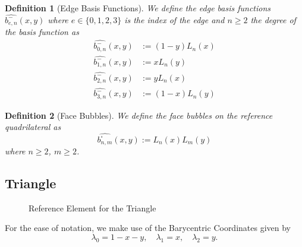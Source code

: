 \documentclass[10pt,a4paper]{article}
\newtheorem{defn}{Definition}
\begin{document}
    \begin{defn}[Edge Basis Functions]
        We define the edge basis functions $\widehat{b_{e,n}^{-}}(x,y)$ where $e \in \{0,1,2,3\}$ is the index of the edge and $n \geq 2$ the degree of the basis function as
        \begin{align*}
            \widehat{b_{0,n}^{-}}(x,y) &:= (1-y)L_n(x) \\
            \widehat{b_{1,n}^{-}}(x,y) &:= xL_n(y) \\
            \widehat{b_{2,n}^{-}}(x,y) &:= yL_n(x) \\
            \widehat{b_{3,n}^{-}}(x,y) &:= (1-x)L_n(y)
        \end{align*}
    \end{defn}

    \begin{defn}[Face Bubbles]
        We define the face bubbles on the reference quadrilateral as
        \begin{equation*}
            \widehat{b_{n,m}^{\square}}(x,y) := L_n(x)L_m(y)
        \end{equation*}
        where $n \geq 2$, $m\geq 2$.
    \end{defn}


\subsection{Triangle}

    \begin{figure}[ht!]
        \center
        \caption{Reference Element for the Triangle}
        \label{fig:ref_tria}
    \end{figure}

    For the ease of notation, we make use of the Barycentric Coordinates given by
    \begin{equation*}
        \lambda_0 = 1-x-y,\quad \lambda_1 = x,\quad \lambda_2 = y.
    \end{equation*}
    
\end{document}
